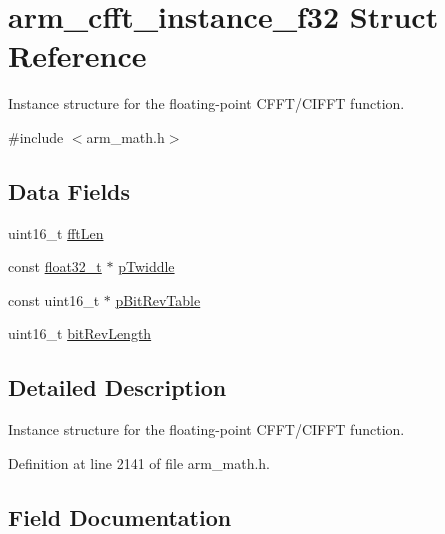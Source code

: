 \hypertarget{structarm__cfft__instance__f32}{}\section{arm\+\_\+cfft\+\_\+instance\+\_\+f32 Struct Reference}
\label{structarm__cfft__instance__f32}


Instance structure for the floating-\/point C\+F\+F\+T/\+C\+I\+F\+FT function.  




{\ttfamily \#include $<$arm\+\_\+math.\+h$>$}

\subsection*{Data Fields}
\begin{DoxyCompactItemize}
\item 
uint16\+\_\+t \hyperlink{structarm__cfft__instance__f32_ab8db3bbe7c61e6bb8ca2a55e3446e11a}{fft\+Len}
\item 
const \hyperlink{arm__math_8h_a4611b605e45ab401f02cab15c5e38715}{float32\+\_\+t} $\ast$ \hyperlink{structarm__cfft__instance__f32_a8292d9775f5c5472f59915649fe3b378}{p\+Twiddle}
\item 
const uint16\+\_\+t $\ast$ \hyperlink{structarm__cfft__instance__f32_a3b229432d381b0a511a9cdbe3aa74e78}{p\+Bit\+Rev\+Table}
\item 
uint16\+\_\+t \hyperlink{structarm__cfft__instance__f32_a65e1b3e327b8fab9404287ed8f347cc8}{bit\+Rev\+Length}
\end{DoxyCompactItemize}


\subsection{Detailed Description}
Instance structure for the floating-\/point C\+F\+F\+T/\+C\+I\+F\+FT function. 

Definition at line 2141 of file arm\+\_\+math.\+h.



\subsection{Field Documentation}
